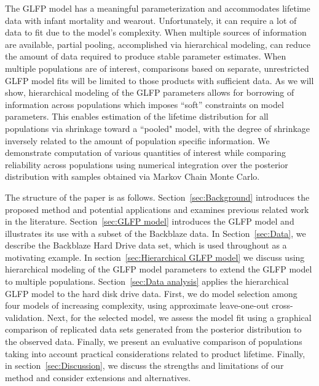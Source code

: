 \documentclass[12pt]{article}
\begin{document}
The GLFP model has a meaningful parameterization and accommodates lifetime data with infant mortality and wearout.  Unfortunately, it can require a lot of data to fit due to the model's complexity. When multiple sources of information are available, partial pooling, accomplished via hierarchical modeling, can reduce the amount of data required to produce stable parameter estimates. When multiple populations are of interest, comparisons based on separate, unrestricted GLFP model fits will be limited to those products with sufficient data. As we will show, hierarchical modeling of the GLFP parameters allows for borrowing of information across populations which imposes ``soft'' constraints on model parameters. This enables estimation of the lifetime distribution for all populations via shrinkage toward a ``pooled" model, with the degree of shrinkage inversely related to the amount of population specific information. We demonstrate computation of various quantities of interest while comparing reliability across populations using numerical integration over the posterior distribution with samples obtained via  Markov Chain Monte Carlo. 

The structure of the paper is as follows. Section~\ref{sec:Background} introduces the proposed method and potential applications and examines previous related work in the literature.  Section~\ref{sec:GLFP model} introduces the GLFP model and illustrates its use with a subset of the Backblaze data.  In Section~\ref{sec:Data}, we describe the Backblaze Hard Drive data set, which is used throughout as a motivating example. In section~\ref{sec:Hierarchical GLFP model} we discuss using hierarchical modeling of the GLFP model parameters to extend the GLFP model to multiple populations. Section~\ref{sec:Data analysis} applies the hierarchical GLFP model to the hard disk drive data. First, we do model selection among four models of increasing complexity, using approximate leave-one-out cross-validation. Next, for the selected model, we assess the model fit using a graphical comparison of replicated data sets generated from the posterior distribution to the observed data. Finally, we present an evaluative comparison of populations taking into account practical considerations related to product lifetime. Finally, in section~\ref{sec:Discussion}, we discuss the strengths and limitations of our method and consider extensions and alternatives.
\end{document}
